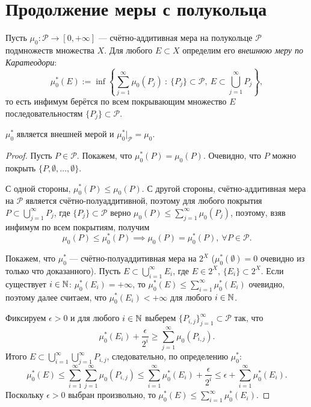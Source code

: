\section{Продолжение меры с полукольца}

\begin{definition}
    Пусть $\mu_0: \mathcal{P} \to [0, + \infty]$ — счётно-аддитивная мера на полукольце $\mathcal{P}$ подмножеств множества $X$. Для любого $E \subset X$ определим его \textit{внешнюю меру по Каратеодори}:
    \[\mu_0^*(E) := \inf \left\{\sum\limits_{j=1}^{\infty} \mu_0(P_j) \ : \ \{P_j\} \subset \mathcal{P}, \ E \subset \bigcup\limits_{j=1}^{\infty}P_j\right\},\]
    то есть инфимум берётся по всем покрывающим множество $E$ последовательностям $\{P_j\} \subset \mathcal{P}$.
\end{definition} 

\begin{theorem}
    $\mu_0^*$ является внешней мерой и $\mu_0^*|_{\mathcal{P}} = \mu_0$.
\end{theorem} 
\begin{proof}
    Пусть $P \in \mathcal{P}$.
    Покажем, что $\mu_0^*(P) = \mu_0(P)$.
    Очевидно, что $P$ можно покрыть $\{P, \emptyset, \dots, \emptyset\}$.

    С одной стороны, $\mu_0^*(P) \leqslant \mu_0(P)$.
    С другой стороны, счётно-аддитивная мера на $\mathcal{P}$ является счётно-полуаддитивной, поэтому для любого покрытия $P \subset \bigcup\limits_{j=1}^{\infty} P_j$, где $\{P_j\} \subset \mathcal{P}$ верно $\mu_0(P) \leqslant \sum\limits_{j=1}^{\infty} \mu_0(P_j)$, поэтому, взяв инфимум по всем покрытиям, получим
    \[\mu_0(P) \leqslant \mu_0^*(P) \implies \mu_0(P) = \mu_0^*(P), \ \forall P \in \mathcal{P}.\]
    
    Покажем, что $\mu_0^*$ — счётно-полуаддитивная мера на $2^X$ ($\mu_0^*(\emptyset)=0$ очевидно из только что доказанного).
    Пусть $E \subset \bigcup\limits_{i=1}^{\infty} E_i$, где $E \in 2^X$, $\{E_i\} \subset 2^X$.
    Если существует $i \in \mathbb{N}$: $\mu_0^*(E_i) = + \infty$, то $\mu_0^*(E) \leqslant \sum\limits_{i=1}^{\infty} \mu_0^*(E_i)$ очевидно, поэтому далее считаем, что $\mu_0^*(E_i) < + \infty$ для любого $i \in \mathbb{N}$.

    Фиксируем $\epsilon > 0$ и для любого $i \in \mathbb{N}$ выберем $\{P_{i,j}\}_{j=1}^{\infty} \subset \mathcal{P}$ так, что 
    \[\mu_0^*(E_i) + \frac{\epsilon}{2^i} \geqslant \sum\limits_{j=1}^{\infty} \mu_0 (P_{i,j}).\]
    Итого $E \subset \bigcup\limits_{i=1}^{\infty} \bigcup\limits_{j=1}^{\infty} P_{i,j}$, следовательно, по определению $\mu_0^*$:
    \[\mu_0^* (E) \leqslant \sum\limits_{i=1}^{\infty} \sum\limits_{j=1}^{\infty} \mu_0(P_{i,j}) \leqslant \sum\limits_{i=1}^{\infty} \mu_0^*(E_i) + \frac{\epsilon}{2^i} \leqslant \epsilon + \sum\limits_{i=1}^{\infty} \mu_0^*(E_i).\]
    Поскольку $\epsilon > 0$ выбран произвольно, то $\mu_0^*(E) \leqslant \sum\limits_{i=1}^{\infty} \mu_0^*(E_i)$.
\end{proof} 

